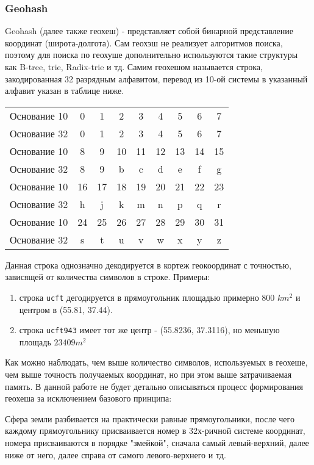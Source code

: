 \subsubsection{Geohash}
Geohash (далее также геохеш) - представляет собой бинарной представление координат (широта-долгота). Сам геохэш не реализует алгоритмов поиска, поэтому для поиска по геохуше дополнительно используются такие структуры как B-tree, trie, Radix-trie и тд.
Самим геохешом называется строка, закодированная 32 разрядным алфавитом, перевод из 10-ой системы в указанный алфавит указан в таблице ниже.
\begin{center}
\begin{tabular}{ c|c c c c c c c c }
 Основание 10 & 0 & 1 & 2 & 3 & 4 & 5 & 6 & 7 \\
 Основание 32 & 0 & 1 & 2 & 3 & 4 & 5 & 6 & 7 \\
  \hline\hline
 Основание 10 & 8 & 9 & 10 & 11 & 12 & 13 & 14 & 15 \\
 Основание 32 & 8 & 9 & b & c & d & e & f & g \\
  \hline\hline
 Основание 10 & 16 & 17 & 18 & 19 & 20 & 21 & 22 & 23  \\
 Основание 32 & h & j & k & m & n & p & q & r \\
  \hline\hline
 Основание 10 & 24 & 25 & 26 & 27 & 28 & 29 & 30 & 31 \\
 Основание 32 & s & t & u & v & w & x & y & z \\
\end{tabular}
\end{center}
Данная строка однозначно декодируется в кортеж геокоординат с точностью, зависящей от количества символов в строке. Примеры:
\begin{enumerate}
    \item строка \texttt{ucft} дегодируется в прямоугольник площадью примерно 800 $ km^2 $ и центром в (55.81, 37.44).
    \item строка \texttt{ucft943} имеет тот же центр - (55.8236, 37.3116), но меньшую площадь $23409 m^2$
\end{enumerate}
Как можно наблюдать, чем выше количество символов, используемых в геохеше, чем выше точность получаемых координат, но при этом выше затрачиваемая память.
В данной работе не будет детально описываться процесс формирования геохеша за исключением базового принципа:

Сфера земли разбивается на практически равные прямоугольники, после чего каждому прямоугольнику присваивается номер в 32х-ричной системе координат, номера присваиваются в порядке "змейкой", сначала самый левый-верхний, далее ниже от него, далее справа от самого левого-верхнего и тд.


